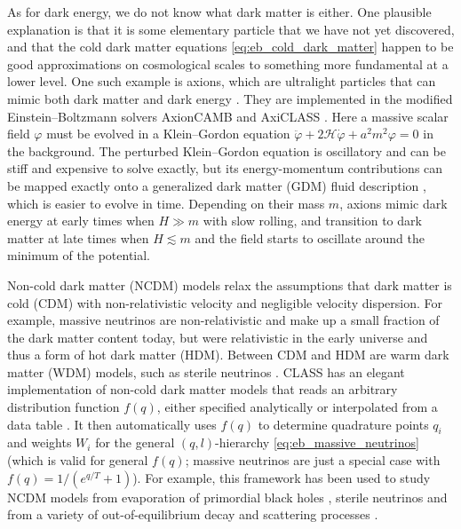 \documentclass[USenglish, thumbmarks]{uiophdthesis} %
\newcommand\EB{Einstein--Boltzmann}
\newcommand\calH{\mathcal{H}}
\newcommand\KG{Klein--Gordon}
\begin{document}
As for dark energy, we do not know what dark matter is either.
One plausible explanation is that it is some elementary particle that we have not yet discovered,
and that the cold dark matter equations \eqref{eq:eb_cold_dark_matter} happen to be good approximations on cosmological scales
to something more fundamental at a lower level.
One such example is axions,
which are ultralight particles that can mimic both dark matter and dark energy
\cite[e.g.][]{marshAxionCosmology2016}.
They are implemented in the modified \EB{} solvers
AxionCAMB \cite{hlozekSearchUltralightAxions2015} and
AxiCLASS \cite{poulinCosmologicalImplicationsUltralight2018}.
Here a massive scalar field $\varphi$ must be evolved in a \KG{} equation
$\ddot{\varphi} + 2 \calH \dot\varphi + a^2 m^2 \varphi = 0$ in the background.
The perturbed \KG{} equation is oscillatory and can be stiff and expensive to solve exactly,
but its energy-momentum contributions can be mapped exactly onto
a generalized dark matter (GDM) fluid description \cite{huStructureFormationGeneralized1998},
which is easier to evolve in time.
Depending on their mass $m$,
axions mimic dark energy at early times when $H \gg m$ with slow rolling,
and transition to dark matter at late times when $H \lesssim m$ and the field starts to oscillate around the minimum of the potential.

Non-cold dark matter (NCDM) models
relax the assumptions that dark matter is cold (CDM) with non-relativistic velocity and negligible velocity dispersion.
For example, massive neutrinos are non-relativistic and make up a small fraction of the dark matter content today,
but were relativistic in the early universe and thus a form of hot dark matter (HDM).
Between CDM and HDM are warm dark matter (WDM) models, such as sterile neutrinos \cite[e.g.][]{boyarskySterileNeutrinoDark2019}.
CLASS has an elegant implementation of non-cold dark matter models
that reads an arbitrary distribution function $f(q)$,
either specified analytically or interpolated from a data table \cite{lesgourguesCosmicLinearAnisotropy2011f}.
It then automatically uses $f(q)$ to determine quadrature points $q_i$ and weights $W_i$
for the general $(q,l)$-hierarchy \eqref{eq:eb_massive_neutrinos}
(which is valid for general $f(q)$; massive neutrinos are just a special case with $f(q) = 1/(e^{q/T}+1)$).
For example, this framework has been used to study NCDM models from
evaporation of primordial black holes \cite{baldesNonColdDarkMatter2020},
sterile neutrinos \cite{venumadhavSterileNeutrinoDark2016,schneiderAstrophysicalConstraintsResonantly2016}
and from a variety of out-of-equilibrium decay and scattering processes \cite{ballesterosHowWarmAre2021}.
\end{document}
